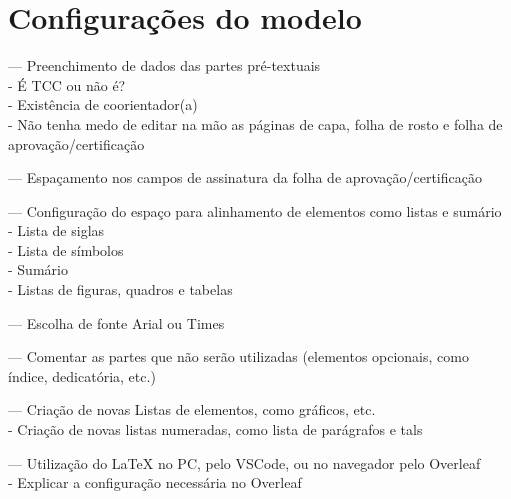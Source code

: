 \chapter{Configurações do modelo}
--- Preenchimento de dados das partes pré-textuais\\
    - É TCC ou não é?\\
    - Existência de coorientador(a)\\
    - Não tenha medo de editar na mão as páginas de capa, folha de rosto e folha de aprovação/certificação

--- Espaçamento nos campos de assinatura da folha de aprovação/certificação

--- Configuração do espaço para alinhamento de elementos como listas e sumário\\
    - Lista de siglas\\
    - Lista de símbolos\\
    - Sumário\\
    - Listas de figuras, quadros e tabelas

--- Escolha de fonte Arial ou Times

--- Comentar as partes que não serão utilizadas (elementos opcionais, como índice, dedicatória, etc.)

--- Criação de novas Listas de elementos, como gráficos, etc.\\
    - Criação de novas listas numeradas, como lista de parágrafos e tals

--- Utilização do \LaTeX{} no PC, pelo VSCode, ou no navegador pelo Overleaf\\
    - Explicar a configuração necessária no Overleaf

